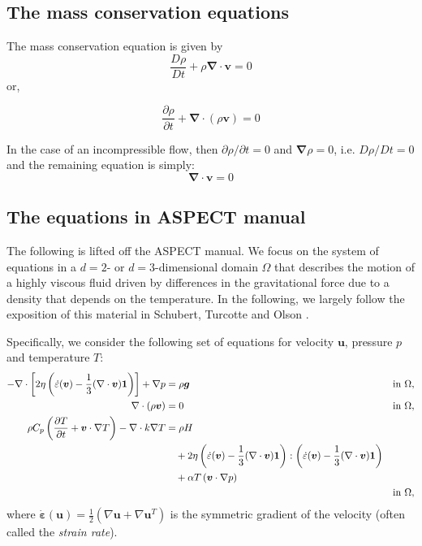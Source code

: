 \subsection{The mass conservation equations} 

The mass conservation equation is given by
\[
\frac{D\rho}{Dt} + \rho {\bm \nabla}\cdot{\bm v} = 0
\]
or, 
\begin{mdframed}[backgroundcolor=blue!5]
\[
\frac{\partial \rho}{\partial t} + {\bm \nabla}\cdot(\rho {\bm v}) = 0
\]
\end{mdframed}
In the case of an incompressible flow, then $\partial \rho/\partial t=0$ and 
${\bm \nabla}\rho=0$, i.e. $D\rho/Dt=0$ and the remaining equation is simply:
\[
{\bm \nabla}\cdot{\bm v} = 0
\]

\subsection{The equations in ASPECT manual}
The following is lifted off the ASPECT manual.
We focus on the system of equations in a $d=2$- or $d=3$-dimensional
domain $\Omega$ that describes the motion of a highly viscous fluid driven
by differences in the gravitational force due to a density that depends on
the temperature. In the following, we largely follow the exposition of this
material in Schubert, Turcotte and Olson \cite{scto01}.

Specifically, we consider the following set of equations for velocity $\mathbf
u$, pressure $p$ and temperature $T$:
\begin{align}
  \label{eq:stokes-1}
  -\nabla \cdot \left[2\eta \left(\dot\varepsilon(\bm v)
                                  - \frac{1}{3}(\nabla \cdot \bm v)\mathbf 1\right)
                \right] + \nabla p &=
  \rho \bm g
  &
  & \textrm{in $\Omega$},
  \\
  \label{eq:stokes-2}
  \nabla \cdot (\rho \bm v) &= 0
  &
  & \textrm{in $\Omega$},
  \\
  \label{eq:temperature}
  \rho C_p \left(\frac{\partial T}{\partial t} + \bm v\cdot\nabla T\right)
  - \nabla\cdot k\nabla T
  &=
  \rho H
  \notag
  \\
  &\quad
  +
  2\eta
  \left(\dot\varepsilon(\bm v) - \frac{1}{3}(\nabla \cdot \bm v)\mathbf 1\right)
  :
  \left(\dot\varepsilon(\bm v) - \frac{1}{3}(\nabla \cdot \bm v)\mathbf 1\right)
  \\
  &\quad
  +\alpha T \left( \bm v \cdot \nabla p \right)
  \notag
  \\
  &\quad
  &
  & \textrm{in $\Omega$},
  \notag
\end{align}
where $\dot{\bm \varepsilon}(\mathbf u) = \frac{1}{2}(\nabla \mathbf u + \nabla\mathbf
u^T)$ is the symmetric gradient of the velocity (often called the
\textit{strain rate}).%

